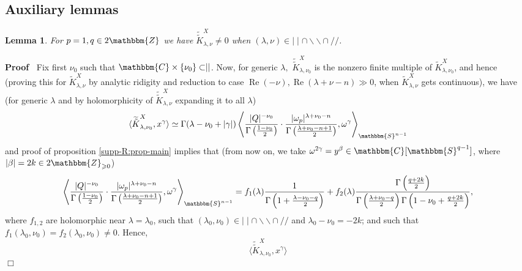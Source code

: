 \documentclass[12pt]{article}
\newcommand{\tmop}[1]{\ensuremath{\operatorname{#1}}}
\renewenvironment{proof}{\noindent\textbf{Proof\ }}{\hspace*{\fill}$\Box$\medskip}
\newtheorem{lemma}[proposition]{Lemma}
\theoremstyle{remark}
\begin{document}
\subsection{Auxiliary lemmas}

\begin{lemma}
  \label{supp-sing:lem-strangelove}For $p = 1, q \in 2\mathbbm{Z}$ we have
  $\widetilde{\tilde{K}}_{\lambda, \nu}^X \neq 0$ when $(\lambda, \nu) \in
  \mid \mid \cap \backslash\backslash \cap / /$.
\end{lemma}

\begin{proof}
  Fix first $\nu_0$ such that $\mathbbm{C} \times \{ \nu_0 \} \subset \mid
  \mid$. Now, for generic $\lambda,$ $\widetilde{\tilde{K}}_{\lambda,
  \nu_0}^X$ is the nonzero finite multiple of $\tilde{K}_{\lambda, \nu_0}^X$,
  and hence (proving this for $\tilde{K}_{\lambda, \nu}^X$ by analytic
  ridigity and reduction to case $\tmop{Re} (- \nu), \tmop{Re} (\lambda + \nu
  - n) \gg 0$, when $\tilde{K}_{\lambda, \nu}^X$ gets continuous), we have
  (for generic $\lambda$ and by holomorphicity of
  $\widetilde{\tilde{K}}_{\lambda, \nu}^X$ expanding it to all $\lambda$)
  \[ \langle \widetilde{\tilde{K}}_{\lambda, \nu_0}^X, x^{\gamma} \rangle
     \simeq \Gamma (\lambda - \nu_0 + | \gamma |) \left\langle \frac{| Q |^{-
     \nu_0}}{\Gamma \left( \frac{1 - \nu_0}{2} \right)} \cdot \frac{| \omega_p
     |^{\lambda + \nu_0 - n}}{\Gamma \left( \frac{\lambda + \nu_0 - n + 1}{2}
     \right)}, \omega^{\gamma} \right\rangle_{\mathbbm{S}^{n - 1}} \]
  and proof of proposition \ref{supp-R:prop-main} implies that (from now on,
  we take $\omega^{2 \gamma} = y^{\beta} \in \mathbbm{C} [\mathbbm{S}^{q -
  1}]$, where $| \beta | = 2 k \in 2\mathbbm{Z}_{\geqslant 0}$)
  \[ \left\langle \frac{| Q |^{- \nu_0}}{\Gamma \left( \frac{1 - \nu_0}{2}
     \right)} \cdot \frac{| \omega_p |^{\lambda + \nu_0 - n}}{\Gamma \left(
     \frac{\lambda + \nu_0 - n + 1}{2} \right)}, \omega^{\gamma}
     \right\rangle_{\mathbbm{S}^{n - 1}} = f_1 (\lambda) \frac{1}{\Gamma
     \left( 1 + \frac{\lambda - \nu_0 - q}{2} \right)} + f_2 (\lambda)
     \frac{\Gamma \left( \frac{q + 2 k}{2} \right)}{\Gamma \left(
     \frac{\lambda + \nu_0 - q}{2} \right) \Gamma \left( 1 - \nu_0 + \frac{q +
     2 k}{2} \right)}, \]
  where $f_{1, 2}$ are holomorphic near $\lambda = \lambda_0$, such that
  $(\lambda_0, \nu_0) \in \mid \mid \cap \backslash\backslash \cap / /$ and
  $\lambda_0 - \nu_0 = - 2 k$; and such that $f_1 (\lambda_0, \nu_0) = f_2
  (\lambda_0, \nu_0) \neq 0$. Hence,
  \[ \langle \widetilde{\tilde{K}}_{\lambda, \nu_0}^X, x^{\gamma} \rangle
\]
\end{proof}
\end{document}
